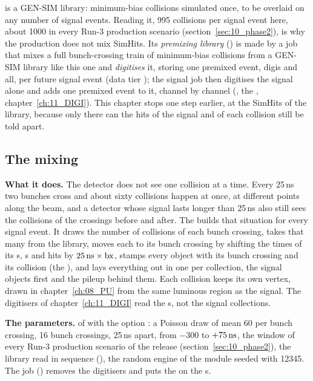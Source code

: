 \begin{plainwords}
 is a GEN-SIM library: minimum-bias collisions simulated once, to be overlaid
on any number of signal events. Reading it, 995 collisions per signal event here, about 1000 in every Run-3
production scenario (section~\ref{sec:10_phase2}), is why the production does not mix SimHits. Its \emph{premixing library} () is made by a job that mixes a full bunch-crossing
train of minimum-bias collisions from a GEN-SIM library like this one and \emph{digitises} it, storing one premixed
event, digis and all, per future signal event (data tier ); the signal job then digitises the signal
alone and adds one premixed event to it, channel by channel (, the ,
chapter~\ref{ch:11_DIGI}). This chapter stops one step earlier, at the SimHits of the library, because only there
can the hits of the signal and of each collision still be told apart.
\end{plainwords}

\subsection{The mixing}
\label{sec:10_mixing}

\textbf{What it does.} The detector does not see one collision at a time. Every 25\,ns two bunches cross and about
sixty collisions happen at once, at different points along the beam, and a detector whose signal lasts longer than
25\,ns also still sees the collisions of the crossings before and after. The  builds that
situation for every signal event. It draws the number of collisions of each bunch crossing, takes that many from the
library, moves each to its bunch crossing by shifting the times of its s, s and hits by
$25\,\mathrm{ns}\times\mathrm{bx}$, stamps every object with its bunch crossing and its collision (the ), and lays
everything out in one  per collection, the signal objects first and the pileup behind them. Each
collision keeps its own vertex, drawn in chapter~\ref{ch:08_PU} from the same luminous region as the signal. The
digitisers of chapter~\ref{ch:11_DIGI} read the s, not the signal collections.

\textbf{The parameters.}  of  with the option
 : a Poisson draw of mean 60 per bunch crossing, 16
bunch crossings, 25\,ns apart, from $-300$ to $+75\,\mathrm{ns}$, the window of every Run-3 production scenario of the release
(section~\ref{sec:10_phase2}), the library read in sequence (), the random engine of
the module seeded with 12345. The job () removes the digitisers and puts the
 on the s.

